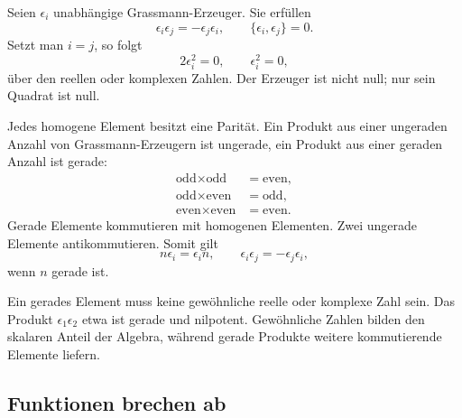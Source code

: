 Seien \(\epsilon_i\) unabhängige Grassmann-Erzeuger. Sie erfüllen
\begin{equation}
\epsilon_i\epsilon_j=-\epsilon_j\epsilon_i,
\qquad
\{\epsilon_i,\epsilon_j\}=0.
\end{equation}
Setzt man \(i=j\), so folgt
\begin{equation}
2\epsilon_i^2=0,
\qquad
\epsilon_i^2=0,
\end{equation}
über den reellen oder komplexen Zahlen. Der Erzeuger ist nicht null; nur sein Quadrat ist null.

Jedes homogene Element besitzt eine Parität. Ein Produkt aus einer ungeraden Anzahl von Grassmann-Erzeugern ist ungerade, ein Produkt aus einer geraden Anzahl ist gerade:
\begin{align}
\text{odd}\times\text{odd}&=\text{even},\\
\text{odd}\times\text{even}&=\text{odd},\\
\text{even}\times\text{even}&=\text{even}.
\end{align}
Gerade Elemente kommutieren mit homogenen Elementen. Zwei ungerade Elemente antikommutieren. Somit gilt
\begin{equation}
n\epsilon_i=\epsilon_i n,
\qquad
\epsilon_i\epsilon_j=-\epsilon_j\epsilon_i,
\end{equation}
wenn \(n\) gerade ist.

Ein gerades Element muss keine gewöhnliche reelle oder komplexe Zahl sein. Das Produkt
\(\epsilon_1\epsilon_2\) etwa ist gerade und nilpotent. Gewöhnliche Zahlen bilden den skalaren Anteil der Algebra, während gerade Produkte weitere kommutierende Elemente liefern.

\begin{classroomqa}
\end{classroomqa}

\subsection{Funktionen brechen ab}

